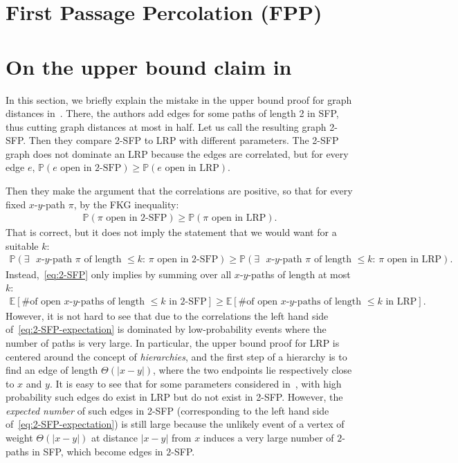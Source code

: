 \documentclass[11pt, letterpaper, margin=1in]{amsart}
\theoremstyle{definition}
\theoremstyle{remark}
\newcommand{\Expected}[1]{\ensuremath{ \mathbb{E} \left[ #1 \right] } }
\renewcommand{\Pr}[1]{\ensuremath{\mathbb{P} \left(#1 \right) }}
\numberwithin{equation}{section}
\begin{document}
\section{First Passage Percolation (FPP)}\label{sec:FPP}


	


\appendix

\section{On the upper bound claim in \cite{hao2023graph}}\label{sec:wrong_proof}

In this section, we briefly explain the mistake in the upper bound proof for graph distances in~\cite{hao2023graph}. There, the authors add edges for some paths of length 2 in SFP, thus cutting graph distances at most in half. Let us call the resulting graph 2-SFP. Then they compare 2-SFP to LRP with different parameters. The 2-SFP graph does not dominate an LRP because the edges are correlated, but for every edge $e$, $\Pr{e \text{ open in 2-SFP}} \ge \Pr{e \text{ open in LRP}}$.

Then they make the argument that the correlations are positive, so that for every fixed $x$-$y$-path $\pi$, by the FKG inequality:
\begin{align}\label{eq:2-SFP}
\Pr{\text{$\pi$ open in 2-SFP}} \ge \Pr{\text{$\pi$ open in LRP}}.
\end{align}
That is correct, but it does not imply the statement that we would want for a suitable $k$:
\begin{align}\label{eq:2-SFP-probability}
\Pr{\text{$\exists$ $x$-$y$-path $\pi$ of length $\le k$: $\pi$ open in 2-SFP}} \ge \Pr{\text{$\exists$ $x$-$y$-path $\pi$ of length $\le k$: $\pi$ open in LRP}}. 
\end{align}
Instead,~\eqref{eq:2-SFP} only implies by summing over all $x$-$y$-paths of length at most $k$:
\begin{align}\label{eq:2-SFP-expectation}
\Expected{\text{\# of open $x$-$y$-paths of length $\le k$ in 2-SFP}} \ge \Expected{\text{\# of open $x$-$y$-paths of length $\le k$ in LRP}}.
\end{align}
However, it is not hard to see that due to the correlations the left hand side of~\eqref{eq:2-SFP-expectation} is dominated by low-probability events where the number of paths is very large. In particular, the upper bound proof for LRP is centered around the concept of \emph{hierarchies}, and the first step of a hierarchy is to find an edge of length $\Theta(|x-y|)$, where the two endpoints lie respectively close to $x$ and $y$. It is easy to see that for some parameters considered in~\cite{hao2023graph}, with high probability such edges do exist in LRP but do not exist in 2-SFP. However, the \emph{expected number} of such edges in 2-SFP (corresponding to the left hand side of~\eqref{eq:2-SFP-expectation}) is still large because the unlikely event of a vertex of weight $\Theta(|x-y|)$ at distance $|x-y|$ from $x$ induces a very large number of $2$-paths in SFP, which become edges in $2$-SFP.
\end{document}
